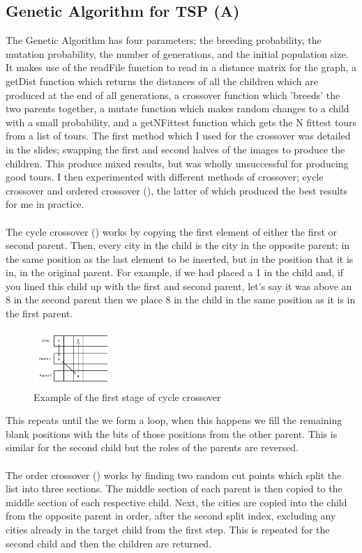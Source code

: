 \documentclass{article}
\begin{document}
\subsection{Genetic Algorithm for TSP (A)}
The Genetic Algorithm has four parameters; the breeding probability, the mutation probability, the number of generations, and the initial population size. It makes use of the readFile function to read in a distance matrix for the graph, a getDist function which returns the distances of all the children which are produced at the end of all generations, a crossover function which 'breeds' the two parents together, a mutate function which makes random changes to a child with a small probability, and a getNFittest function which gets the N fittest tours from a list of tours. The first method which I used for the crossover was detailed in the slides; swapping the first and second halves of the images to produce the children. This produce mixed results, but was wholly unsuccessful for producing good tours. I then experimented with different methods of crossover; cycle crossover and ordered crossover (\cite{crossover}), the latter of which produced the best results for me in practice. \\\\The cycle crossover (\cite{crossover}) works by copying the first element of either the first or second parent. Then, every city in the child is the city in the opposite parent; in the same position as the last element to be inserted, but in the position that it is in, in the original parent. For example, if we had placed a 1 in the child and, if you lined this child up with the first and second parent, let's say it was above an 8 in the second parent then we place 8 in the child in the same position as it is in the first parent. 
\begin{figure}
\caption{Example of the first stage of cycle crossover}
\centering \includegraphics[width=0.25\textwidth]{CXExample}
\end{figure} 
This repeats until the we form a loop, when this happens we fill the remaining blank positions with the bits of those positions from the other parent. This is similar for the second child but the roles of the parents are reversed.\\\\The order crossover (\cite{crossover}) works by finding two random cut points which split the list into three sections. The middle section of each parent is then copied to the middle section of each respective child. Next, the cities are copied into the child from the opposite parent in order, after the second split index, excluding any cities already in the target child from the first step. This is repeated for the second child and then the children are returned.\\\\
\end{document}
